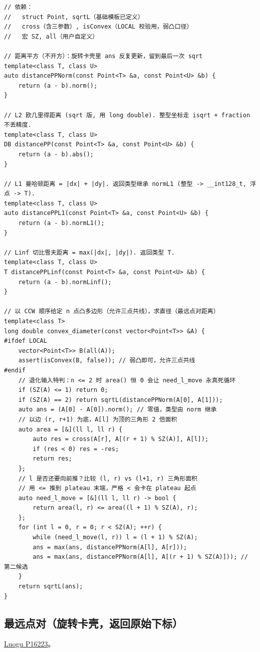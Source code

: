 		\begin{verbatim}
// 依赖：
//   struct Point, sqrtL（基础模板已定义）
//   cross（含三参数）, isConvex（LOCAL 校验用，弱凸口径）
//   宏 SZ, all（用户自定义）

// 距离平方（不开方）：旋转卡壳里 ans 反复更新，留到最后一次 sqrt
template<class T, class U>
auto distancePPNorm(const Point<T> &a, const Point<U> &b) {
	return (a - b).norm();
}

// L2 欧几里得距离 (sqrt 版, 用 long double). 整型坐标走 isqrt + fraction 不丢精度.
template<class T, class U>
DB distancePP(const Point<T> &a, const Point<U> &b) {
	return (a - b).abs();
}

// L1 曼哈顿距离 = |dx| + |dy|. 返回类型继承 normL1 (整型 -> __int128_t, 浮点 -> T).
template<class T, class U>
auto distancePPL1(const Point<T> &a, const Point<U> &b) {
	return (a - b).normL1();
}

// Linf 切比雪夫距离 = max(|dx|, |dy|). 返回类型 T.
template<class T, class U>
T distancePPLinf(const Point<T> &a, const Point<U> &b) {
	return (a - b).normLinf();
}

// 以 CCW 顺序给定 n 点凸多边形（允许三点共线），求直径（最远点对距离）
template<class T>
long double convex_diameter(const vector<Point<T>> &A) {
#ifdef LOCAL
	vector<Point<T>> B(all(A));
	assert(isConvex(B, false)); // 弱凸即可，允许三点共线
#endif
	// 退化输入特判：n <= 2 时 area() 恒 0 会让 need_l_move 永真死循环
	if (SZ(A) <= 1) return 0;
	if (SZ(A) == 2) return sqrtL(distancePPNorm(A[0], A[1]));
	auto ans = (A[0] - A[0]).norm(); // 零值，类型由 norm 继承
	// 以边 (r, r+1) 为底，A[l] 为顶的三角形 2 倍面积
	auto area = [&](ll l, ll r) {
		auto res = cross(A[r], A[(r + 1) % SZ(A)], A[l]);
		if (res < 0) res = -res;
		return res;
	};
	// l 是否还要向前推？比较 (l, r) vs (l+1, r) 三角形面积
	// 用 <= 推到 plateau 末端，严格 < 会卡在 plateau 起点
	auto need_l_move = [&](ll l, ll r) -> bool {
		return area(l, r) <= area((l + 1) % SZ(A), r);
	};
	for (int l = 0, r = 0; r < SZ(A); ++r) {
		while (need_l_move(l, r)) l = (l + 1) % SZ(A);
		ans = max(ans, distancePPNorm(A[l], A[r]));
		ans = max(ans, distancePPNorm(A[l], A[(r + 1) % SZ(A)])); // 第二候选
	}
	return sqrtL(ans);
}
		\end{verbatim}

		\subsection{最远点对（旋转卡壳，返回原始下标）}

		\href{https://www.luogu.com.cn/problem/P16223}{Luogu P16223}。

